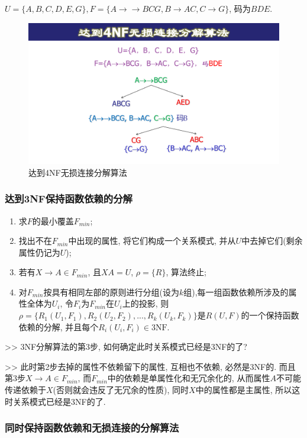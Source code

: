 \begin{example}
  $U=\{A,B,C,D,E,G\}, F=\{A\to\to BCG, B\to AC, C\to G\}$, 码为$BDE$.
\end{example}

\begin{figure}[H]
    \centering
    \includegraphics[width=.6\textwidth]{./figure/4NF无损连接分解.pdf}
    \caption{达到4NF无损连接分解算法}
\end{figure}

\subsubsection{达到3NF保持函数依赖的分解}

\begin{enumerate}
    \item 求$F$的最小覆盖$F_{min}$;
    
    \item 找出不在$F_{min}$中出现的属性, 将它们构成一个关系模式, 并从$U$中去掉它们(剩余属性仍记为$U$);
    
    \item 若有$X \rightarrow A \in F_{min}$, 且$XA = U$, $\rho = \{R\}$, 算法终止;
    
    \item 对$F_{min}$按具有相同左部的原则进行分组(设为$k$组),每一组函数依赖所涉及的属性全体为$U_i$, 令$F_i$为$F_{min}$在$U_i$上的投影, 则$\rho = \{R_1(U_1,F_1), R_2(U_2,F_2), ..., R_k(U_k,F_k)\}$是$R(U,F)$的一个保持函数依赖的分解, 并且每个$R_i(U_i,F_i) \in \text{3NF}$.
\end{enumerate}

>> 3NF分解算法的第3步, 如何确定此时关系模式已经是3NF的了?

>> 此时第2步去掉的属性不依赖留下的属性, 互相也不依赖, 必然是3NF的. 
而且第3步$X\to A\in F_{min}$, 而$F_{min}$中的依赖是单属性化和无冗余化的, 
从而属性$A$不可能传递依赖于$X$(否则就会违反了无冗余的性质), 同时$X$中的属性都是主属性, 所以这时关系模式已经是3NF的了.

\subsubsection{同时保持函数依赖和无损连接的分解算法}

